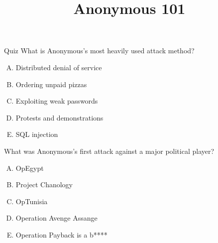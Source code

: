 \documentclass{beamer}
\title{Anonymous 101}
\date{}
\begin{document}
\begin{frame}
\titlepage
\end{frame}

\begin{frame}{Quiz}
%
%
What is Anonymous's most heavily used attack method?
\begin{enumerate}[(A)]
\item<1-2> Distributed denial of service %
\item<1> Ordering unpaid pizzas
\item<1> Exploiting weak passwords
\item<1> Protests and demonstrations
\item<1> SQL injection
\end{enumerate}
What was Anonymous's first attack against a major political player?
\begin{enumerate}[(A)]
\item<1> OpEgypt %
\item<1> Project Chanology %
\item<1> OpTunisia %
\item<1> Operation Avenge Assange %
\item<1-2> Operation Payback is a b**** %
\end{enumerate}
\end{frame}
\end{document}
